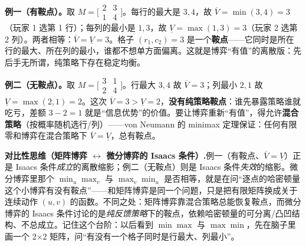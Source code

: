 \begin{example}
\label{ex:dg-saddle}
\textbf{例一（有鞍点）。}\;取 $M=\big[\begin{smallmatrix}2&3\\1&4\end{smallmatrix}\big]$。每行的最大是 $3,4$，故 $\overline V=\min(3,4)=3$（玩家 1 选第 1 行）；每列的最小是 $1,3$，故 $\underline V=\max(1,3)=3$（玩家 2 选第 2 列）。两者相等：$\overline V=\underline V=3$。格子 $(r_1,c_2)=3$ 是一个\textbf{鞍点}——它同时是所在行的最大、所在列的最小，谁都不想单方面偏离。这就是博弈“有值”的离散版：先后手无所谓，纯策略下存在稳定均衡。

\textbf{例二（无鞍点）。}\;取 $M=\big[\begin{smallmatrix}3&1\\2&4\end{smallmatrix}\big]$。行最大 $3,4$ 故 $\overline V=3$；列最小 $2,1$ 故 $\underline V=\max(2,1)=2$。这次 $\overline V=3>\underline V=2$，\textbf{没有纯策略鞍点}：谁先暴露策略谁就吃亏，差额 $3-2=1$ 就是“信息优势”的价值。要让博弈重新“有值”，得允许\textbf{混合策略}（按概率随机选行/列）——von Neumann 的 minimax 定理保证：任何有限零和博弈在混合策略下 $\overline V=\underline V$，总有鞍点。
\end{example}

\begin{note}
\textbf{对比性思维（矩阵博弈 $\leftrightarrow$ 微分博弈的 Isaacs 条件）.}\;例一（有鞍点、$\overline V=\underline V$）正是 Isaacs 条件\emph{成立}的离散缩影；例二（无鞍点）则是 Isaacs 条件\emph{失效}的缩影。微分博弈里那个 $\min_u\max_v$ 与 $\max_v\min_u$ 是否相等，就是在问“逐点的哈密顿量这个小博弈有没有鞍点”——和矩阵博弈是同一个问题，只是把有限矩阵换成关于连续动作 $(u,v)$ 的函数。不同之处：矩阵博弈靠混合策略总能恢复鞍点，而微分博弈的 Isaacs 条件讨论的是\emph{纯反馈策略}下的鞍点，依赖哈密顿量的可分离/凸凹结构、不总成立。记住这个台阶：以后看到 $\min\max$ 与 $\max\min$，先在脑子里画一个 2×2 矩阵，问“有没有一个格子同时是行最大、列最小”。
\end{note}

